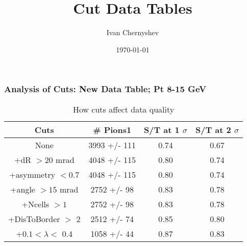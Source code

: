 \documentclass{beamer}
\title{Cut Data Tables}
\author{Ivan Chernyshev}
\date{\today}
\begin{document}

\frame
{
\frametitle{Analysis of Cuts: New Data Table;  Pt 8-15 GeV}
\begin{table}
\caption{How cuts affect data quality}
\centering
\begin{tabular}{c c c c}
\hline\hline
Cuts & \# Pions1 & S/T at 1 $\sigma$ &  S/T at 2 $\sigma$ \\ [0.5ex] %
\hline
None & 3993 +/- 111 & 0.74 & 0.67 \\
+dR $> 20$ mrad & 4048 +/- 115 & 0.80 & 0.74 \\
+asymmetry $< 0.7$ & 4048 +/- 115 & 0.80 & 0.74 \\
+angle $> 15$ mrad & 2752 +/- 98 & 0.83 & 0.78 \\
+Ncells $> 1$& 2752 +/- 98 & 0.83 & 0.78 \\
+DisToBorder $>$ 2 & 2512 +/- 74 & 0.85 & 0.80 \\
+$0.1 < \lambda <$ 0.4 & 1058 +/- 44 & 0.87 & 0.83 \\ [1ex]
\hline
\end{tabular}
\label{table:nonlin}
\end{table}
}
\end{document}
